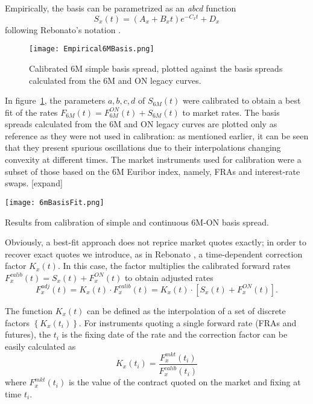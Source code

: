 \documentclass{article}
\begin{document}
Empirically, the basis can be parametrized as an \textit{abcd} function
\begin{equation}
\label{ABCD}
S_x(t) = (A_x + B_x t)e^{-C_x t} + D_x
\end{equation}
following Rebonato's notation \cite{rebonato}.

\begin{figure}[!ht]
\centering
\texttt{[image: Empirical6MBasis.png]}
\caption{Calibrated 6M simple basis spread, plotted against the basis spreads calculated from the 6M and ON legacy curves.}
\label{Empirical6MBasis}
\end{figure}

In figure~\ref{Empirical6MBasis}, the parameters $a,b,c,d$ of $S_{6M}(t)$ were calibrated to obtain a best fit of the rates $F_{6M}(t) = F_{6M}^{ON}(t) + S_{6M}(t)$ to market rates. The basis spreads calculated from the 6M and ON legacy curves are plotted only as reference as they were not used in calibration: as mentioned earlier, it can be seen that they present spurious oscillations due to their interpolations changing convexity at different times. The market instruments used for calibration were a subset of those based on the 6M Euribor index, namely, FRAs and interest-rate swaps. [expand]

\begin{table}[p]
\centering
\texttt{[image: 6mBasisFit.png]}
\caption{Results from calibration of simple and continuous 6M-ON basis spread.}
\label{6mBasisFit}
\end{table}

Obviously, a best-fit approach does not reprice market quotes exactly; in order to recover exact quotes we introduce, as in Rebonato \cite{rebonato}, a time-dependent correction factor $K_x(t)$.
In this case, the factor multiplies the calibrated forward rates $F_x^{calib}(t) = S_x(t) + F_x^{ON}(t)$ to obtain adjusted rates $$F_x^{adj}(t) = K_x(t) \cdot F_x^{calib}(t) = K_x(t) \cdot [S_x(t) + F_x^{ON}(t)].$$

The function $K_x(t)$ can be defined as the interpolation of a set of discrete factors $\left\{K_x(t_i)\right\}$. 
For instruments quoting a single forward rate (FRAs and futures), the $t_i$ is the fixing date of the rate and the correction factor can be easily calculated as
\begin{equation}
\label{direct-k}
K_x(t_i) = \frac{F_x^{mkt}(t_i)}{F_x^{calib}(t_i)}
\end{equation}
where $F_x^{mkt}(t_i)$ is the value of the contract quoted on the market and fixing at time $t_i$.
\end{document}
